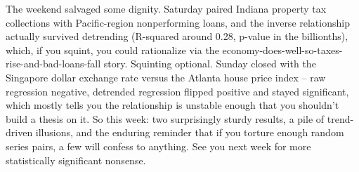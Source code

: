 The weekend salvaged some dignity. Saturday paired Indiana property tax collections with Pacific-region nonperforming loans, and the inverse relationship actually survived detrending (R-squared around 0.28, p-value in the billionths), which, if you squint, you could rationalize via the economy-does-well-so-taxes-rise-and-bad-loans-fall story. Squinting optional. Sunday closed with the Singapore dollar exchange rate versus the Atlanta house price index -- raw regression negative, detrended regression flipped positive and stayed significant, which mostly tells you the relationship is unstable enough that you shouldn't build a thesis on it. So this week: two surprisingly sturdy results, a pile of trend-driven illusions, and the enduring reminder that if you torture enough random series pairs, a few will confess to anything. See you next week for more statistically significant nonsense.
